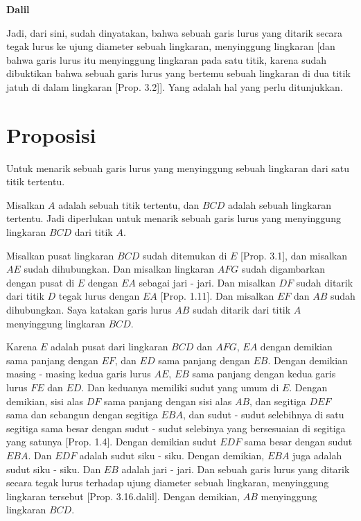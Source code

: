 \documentclass[a4paper]{book}
\begin{document}
\begin{center}\textbf{Dalil}\end{center}
Jadi, dari sini, sudah dinyatakan, bahwa sebuah garis lurus yang ditarik secara
tegak lurus ke ujung diameter sebuah lingkaran, menyinggung 
lingkaran [dan bahwa garis lurus itu menyinggung lingkaran pada satu titik, 
karena sudah dibuktikan bahwa sebuah garis lurus yang bertemu sebuah lingkaran 
di dua titik jatuh di dalam lingkaran [Prop. 3.2]]. Yang adalah hal yang perlu 
ditunjukkan.

\section*{\centering Proposisi \thesection}
Untuk menarik sebuah garis lurus yang menyinggung sebuah lingkaran dari satu
titik tertentu.
\begin{center}
\end{center}
Misalkan $A$ adalah sebuah titik tertentu, dan $BCD$ adalah sebuah lingkaran 
tertentu. Jadi diperlukan untuk menarik sebuah garis lurus yang menyinggung 
lingkaran $BCD$ dari titik $A$.

Misalkan pusat lingkaran $BCD$ sudah ditemukan di $E$ [Prop. 3.1], dan misalkan
$AE$ sudah dihubungkan. Dan misalkan lingkaran $AFG$ sudah digambarkan dengan 
pusat di $E$ dengan $EA$ sebagai jari - jari. Dan misalkan $DF$ sudah ditarik
dari titik $D$ tegak lurus dengan $EA$ [Prop. 1.11]. Dan misalkan $EF$ dan
$AB$ sudah dihubungkan. Saya katakan garis lurus $AB$ sudah ditarik dari titik
$A$ menyinggung lingkaran $BCD$.

Karena $E$ adalah pusat dari lingkaran $BCD$ dan $AFG$, $EA$ dengan demikian 
sama panjang dengan $EF$, dan $ED$ sama panjang dengan $EB$. Dengan demikian
masing - masing kedua garis lurus $AE$, $EB$ sama panjang dengan kedua garis
lurus $FE$ dan $ED$. Dan keduanya memiliki sudut yang umum di $E$. Dengan 
demikian, sisi alas $DF$ sama panjang dengan sisi alas $AB$, dan segitiga $DEF$
sama dan sebangun dengan segitiga $EBA$, dan sudut - sudut selebihnya di satu
segitiga sama besar dengan sudut - sudut selebinya yang bersesuaian di segitiga 
yang satunya [Prop. 1.4]. Dengan demikian sudut $EDF$ sama besar dengan sudut 
$EBA$. Dan $EDF$ adalah sudut siku - siku. Dengan demikian, $EBA$ juga adalah
sudut siku - siku. Dan $EB$ adalah jari - jari. Dan sebuah garis lurus
yang ditarik secara tegak lurus terhadap ujung diameter sebuah lingkaran, 
menyinggung lingkaran tersebut [Prop. 3.16.dalil]. Dengan demikian, $AB$ 
menyinggung lingkaran $BCD$.
\end{document}

